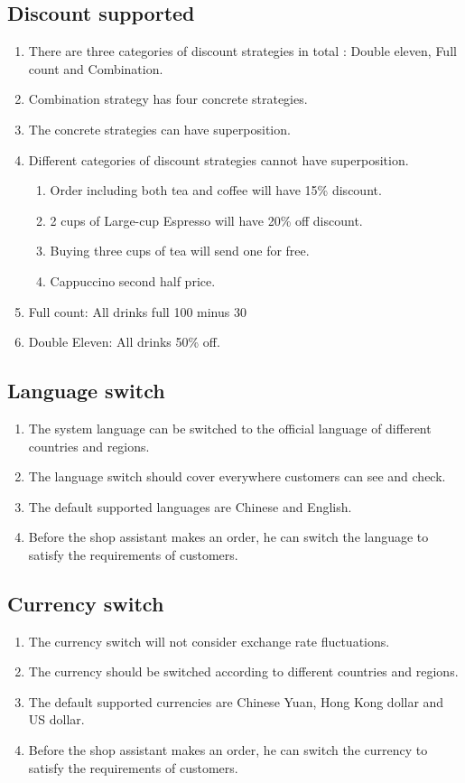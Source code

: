 \documentclass[a4paper]{report}
\begin{document}
\subsection{Discount supported}
\begin{enumerate}
\item There are three categories of discount strategies in total : Double eleven, Full count and Combination.
\item Combination strategy has four concrete strategies.
\item The concrete strategies can have superposition.
\item Different categories of discount strategies cannot have superposition.
\begin{enumerate}
\item Order including both tea and coffee will have 15\% discount.
\item 2 cups of Large-cup Espresso will have 20\% off discount.
\item Buying three cups of tea will send one for free.
\item Cappuccino second half price.
\end{enumerate}
\item Full count: All drinks full 100 minus 30
\item Double Eleven: All drinks 50\% off.
\end{enumerate}

\subsection{Language switch}
\begin{enumerate}
\item The system language can be switched to the official language of different countries and regions.
\item The language switch should cover everywhere customers can see and check.
\item The default supported languages are Chinese and English.
\item Before the shop assistant makes an order, he can switch the language to satisfy the requirements of customers.
\end{enumerate}

\subsection{Currency switch}
\begin{enumerate}
\item The currency switch will not consider exchange rate fluctuations.
\item The currency should be switched according to different countries and regions.
\item The default supported currencies are Chinese Yuan, Hong Kong dollar and US dollar.
\item  Before the shop assistant makes an order, he can switch the currency to satisfy the requirements of customers.
\end{enumerate}
\end{document}
